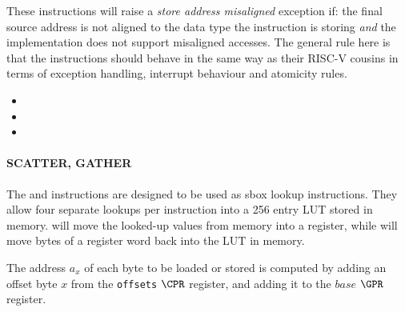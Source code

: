 These instructions will raise a {\em store address misaligned} exception
if: the final source address is not aligned to the data type the instruction
is storing {\em and} the implementation does not support misaligned accesses.
The general rule here is that the  instructions should behave in
the same way as their RISC-V cousins in terms of exception handling,
interrupt behaviour and atomicity rules.

\begin{itemize}
\item {}
\item {}
\item {}
\end{itemize}


\paragraph{SCATTER, GATHER}

The  and  instructions are designed to be used as
sbox lookup instructions. They allow four separate lookups per instruction
into a 256 entry LUT stored in memory.  will move the looked-up
values from memory into a register, while  will move bytes of a
register word back into the LUT in memory.

The address $a_x$ of each byte to be loaded or stored is computed by
adding an offset byte $x$ from the {\tt offsets} $\CPR$ register, and
adding it to the $base$ $\GPR$ register.

